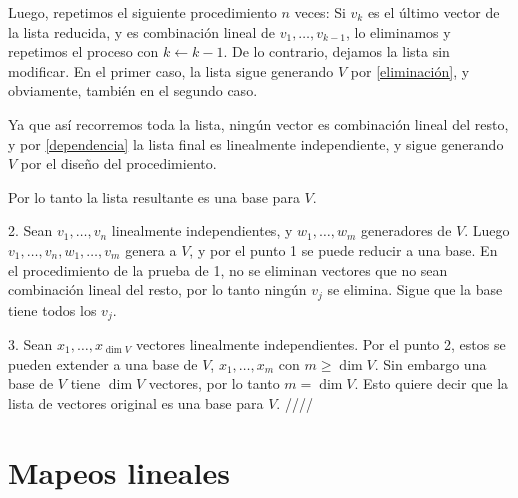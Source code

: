 \documentclass{article}
\begin{document}
Luego, repetimos el siguiente procedimiento $n$ veces:
Si $v_k$ es el último vector de la lista reducida, y es
combinación lineal de $v_1,\ldots,v_{k-1}$, lo eliminamos y repetimos el proceso con $k\leftarrow k-1$. De lo contrario, dejamos la lista
sin modificar. En el primer caso, la lista sigue generando $V$ por
\ref{eliminación}, y obviamente, también en el segundo caso.

Ya que así recorremos toda la lista, ningún vector es combinación
lineal del resto, y por \ref{dependencia} la lista final es 
linealmente independiente, y sigue generando $V$ por el diseño
del procedimiento.

Por lo tanto la lista resultante es una base para $V$. 

2. Sean $v_1,\ldots,v_n$ linealmente independientes,
y $w_1,\ldots, w_m$ generadores de $V$.
Luego $v_1,\ldots,v_n,w_1,\ldots,v_m$ genera a $V$, y por
el punto 1 se puede reducir a una base. En el procedimiento de la
prueba de 1, no se eliminan vectores que no sean combinación lineal del
resto, por lo tanto ningún $v_j$ se elimina. Sigue que la base
tiene todos los $v_j$.



3. Sean $x_1,\ldots,x_{\dim V}$ vectores linealmente independientes.
Por el punto 2, estos se pueden extender a una base de $V$,
$x_1,\ldots,x_m$ con $m\geq \dim V$. Sin embargo una base de $V$ tiene
$\dim V$ vectores, por lo tanto $m=\dim V$. Esto quiere decir
que la lista de vectores original es una base para $V$.
\hfill ////
    
\newpage

\section{Mapeos lineales}
\end{document}
